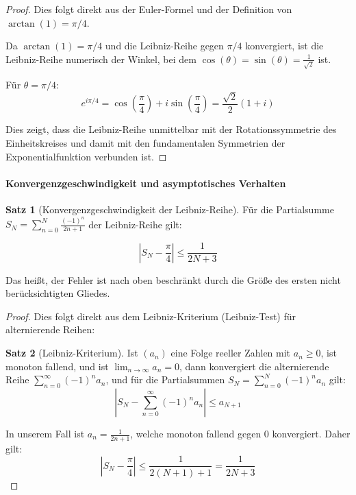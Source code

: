 \documentclass[a4paper,12pt,twoside]{report}
\theoremstyle{definition}
\newtheorem{satz}{Satz}
\begin{document}
\begin{proof}
Dies folgt direkt aus der Euler-Formel und der Definition von $\arctan(1) = \pi/4$.

Da $\arctan(1) = \pi/4$ und die Leibniz-Reihe gegen $\pi/4$ konvergiert, ist die Leibniz-Reihe numerisch der Winkel, bei dem $\cos(\theta) = \sin(\theta) = \frac{1}{\sqrt{2}}$ ist.

Für $\theta = \pi/4$:
\begin{equation}
e^{i\pi/4} = \cos\left(\frac{\pi}{4}\right) + i\sin\left(\frac{\pi}{4}\right) = \frac{\sqrt{2}}{2} \left(1 + i\right)
\end{equation}

Dies zeigt, dass die Leibniz-Reihe unmittelbar mit der Rotationssymmetrie des Einheitskreises und damit mit den fundamentalen Symmetrien der Exponentialfunktion verbunden ist.
\end{proof}

\paragraph{Konvergenzgeschwindigkeit und asymptotisches Verhalten}

\begin{satz}[Konvergenzgeschwindigkeit der Leibniz-Reihe]
Für die Partialsumme $S_N = \sum_{n=0}^{N} \frac{(-1)^n}{2n+1}$ der Leibniz-Reihe gilt:

\begin{equation}
\left|S_N - \frac{\pi}{4}\right| \leq \frac{1}{2N+3}
\end{equation}

Das heißt, der Fehler ist nach oben beschränkt durch die Größe des ersten nicht berücksichtigten Gliedes.
\end{satz}

\begin{proof}
Dies folgt direkt aus dem Leibniz-Kriterium (Leibniz-Test) für alternierende Reihen:

\begin{satz}[Leibniz-Kriterium]
Ist $(a_n)$ eine Folge reeller Zahlen mit $a_n \geq 0$, ist monoton fallend, und ist $\lim_{n \to \infty} a_n = 0$, dann konvergiert die alternierende Reihe $\sum_{n=0}^{\infty} (-1)^n a_n$, und für die Partialsummen $S_N = \sum_{n=0}^{N} (-1)^n a_n$ gilt:
\begin{equation}
|S_N - \sum_{n=0}^{\infty} (-1)^n a_n| \leq a_{N+1}
\end{equation}
\end{satz}

In unserem Fall ist $a_n = \frac{1}{2n+1}$, welche monoton fallend gegen 0 konvergiert. Daher gilt:
\begin{equation}
\left|S_N - \frac{\pi}{4}\right| \leq \frac{1}{2(N+1)+1} = \frac{1}{2N+3}
\end{equation}
\end{proof}
\end{document}
